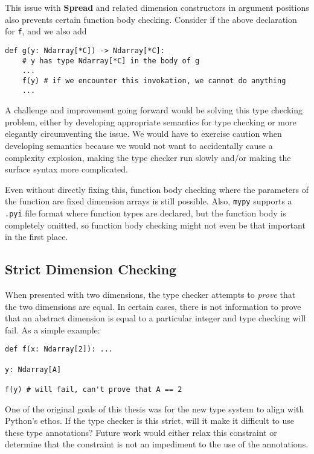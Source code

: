 \documentclass{report}
\begin{document}
This issue with \textbf{Spread} and related dimension constructors in argument positions also prevents certain function body checking. Consider if the above declaration for \texttt{f}, and we also add

\begin{singlespace*}
    \begin{verbatim}
def g(y: Ndarray[*C]) -> Ndarray[*C]:
    # y has type Ndarray[*C] in the body of g
    ...
    f(y) # if we encounter this invokation, we cannot do anything
    ...\end{verbatim}

\end{singlespace*}
A challenge and improvement going forward would be solving this type checking problem, either by developing appropriate semantics for type checking or more elegantly circumventing the issue. We would have to exercise caution when developing semantics because we would not want to accidentally cause a complexity explosion, making the type checker run slowly and/or making the surface syntax more complicated.

Even without directly fixing this, function body checking where the parameters of the function are fixed dimension arrays is still possible. Also, \texttt{mypy} supports a \texttt{.pyi} file format where function types are declared, but the function body is completely omitted, so function body checking might not even be that important in the first place.

\subsection{Strict Dimension Checking}

When presented with two dimensions, the type checker attempts to \textit{prove} that the two dimensions are equal. In certain cases, there is not information to prove that an abstract dimension is equal to a particular integer and type checking will fail. As a simple example:

\begin{singlespace*}
    \begin{verbatim}
def f(x: Ndarray[2]): ...

y: Ndarray[A]

f(y) # will fail, can't prove that A == 2\end{verbatim}
\end{singlespace*}

One of the original goals of this thesis was for the new type system to align with Python's ethos. If the type checker is this strict, will it make it difficult to use these type annotations? Future work would either relax this constraint or determine that the constraint is not an impediment to the use of the annotations.
\end{document}
